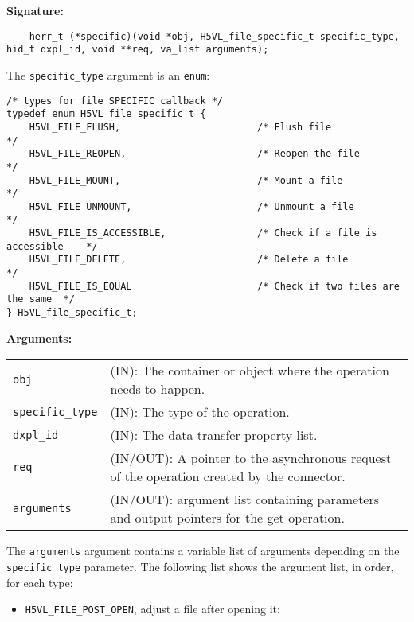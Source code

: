 \begin{mdframed}[style=bgbox] 
\textbf{Signature:}
\begin{lstlisting}
    herr_t (*specific)(void *obj, H5VL_file_specific_t specific_type, hid_t dxpl_id, void **req, va_list arguments);
\end{lstlisting}

The \texttt{specific\_type} argument is an \texttt{enum}:
\begin{lstlisting}
/* types for file SPECIFIC callback */
typedef enum H5VL_file_specific_t {                                              
    H5VL_FILE_FLUSH,                        /* Flush file                       */
    H5VL_FILE_REOPEN,                       /* Reopen the file                  */
    H5VL_FILE_MOUNT,                        /* Mount a file                     */
    H5VL_FILE_UNMOUNT,                      /* Unmount a file                   */
    H5VL_FILE_IS_ACCESSIBLE,                /* Check if a file is accessible    */
    H5VL_FILE_DELETE,                       /* Delete a file                    */
    H5VL_FILE_IS_EQUAL                      /* Check if two files are the same  */
} H5VL_file_specific_t;
\end{lstlisting}

\textbf{Arguments:}\\
\begin{tabular}{l p{13.5cm}}
  \texttt{obj} & (IN): The container or object where the operation needs
  to happen.\\
  \texttt{specific\_type} & (IN): The type of the operation.\\
  \texttt{dxpl\_id} & (IN): The data transfer property list.\\
  \texttt{req} & (IN/OUT): A pointer to the asynchronous request of the
  operation created by the connector.\\
  \texttt{arguments} & (IN/OUT): argument list containing parameters and
  output pointers for the get operation. \\
\end{tabular}

The \texttt{arguments} argument contains a variable list of arguments
depending on the \texttt{specific\_type} parameter. The following list shows
the argument list, in order, for each type:

\begin{itemize}
\item \texttt{H5VL\_FILE\_POST\_OPEN}, adjust a file after opening it:
        

\end{itemize}
\end{mdframed}
